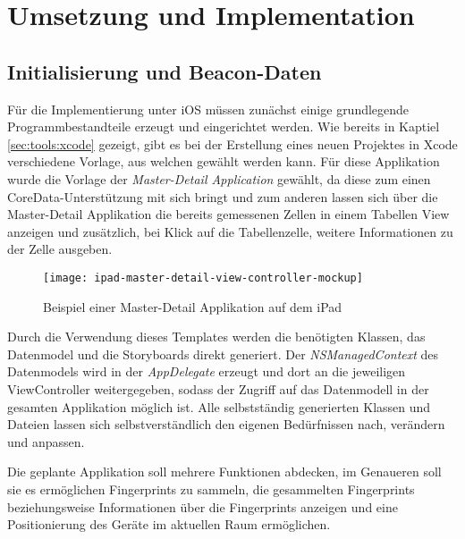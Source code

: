 \chapter{Umsetzung und Implementation}
\label{chap:implementation}


\section{Initialisierung und Beacon-Daten}
\label{sec:implementation:initandbeacon}


Für die Implementierung unter iOS müssen zunächst einige grundlegende Programmbestandteile erzeugt und eingerichtet werden.
Wie bereits in Kaptiel \ref{sec:tools:xcode} gezeigt, gibt es bei der Erstellung eines neuen Projektes in Xcode verschiedene Vorlage, aus welchen gewählt werden kann. Für diese Applikation wurde die Vorlage der \emph{Master-Detail Application} gewählt, da diese zum einen CoreData-Unterstützung mit sich bringt und zum anderen lassen sich über die Master-Detail Applikation die bereits gemessenen Zellen in einem Tabellen View anzeigen und zusätzlich, bei Klick auf die Tabellenzelle, weitere Informationen zu der Zelle ausgeben.

\begin{figure}[htb!]
		\centering
	\texttt{[image: ipad-master-detail-view-controller-mockup]}
	\caption{Beispiel einer Master-Detail Applikation auf dem iPad}
	\label{master-detail-view-controller}
\end{figure}

Durch die Verwendung dieses Templates werden die benötigten Klassen, das Datenmodel und die Storyboards direkt generiert. Der \emph{NSManagedContext} des Datenmodels wird in der \emph{AppDelegate} erzeugt und dort an die jeweiligen ViewController weitergegeben, sodass der Zugriff auf das Datenmodell in der gesamten Applikation möglich ist. Alle selbstständig generierten Klassen und Dateien lassen sich selbstverständlich den eigenen Bedürfnissen nach, verändern und anpassen.

Die geplante Applikation soll mehrere Funktionen abdecken, im Genaueren soll sie es ermöglichen Fingerprints zu sammeln, die gesammelten Fingerprints beziehungsweise Informationen über die Fingerprints anzeigen und eine Positionierung des Geräte im aktuellen Raum ermöglichen.

